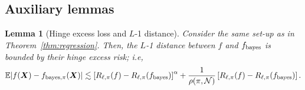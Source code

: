\documentclass[11pt]{article}
\theoremstyle{plain}
\newtheorem{lem}{Lemma}
\theoremstyle{definition}
\def\bayesf{f_{\textup{bayes}}}
\def\bayespif{f_{\textup{bayes},\pi}}
\begin{document}
\clearpage
\subsection{Auxiliary lemmas}


\begin{lem}[Hinge excess loss and $L$-1 distance]\label{lem:hingeL1} Consider the same set-up as in Theorem~\ref{thm:regression}. Then, the $L$-1 distance between $f$ and $\bayesf$ is bounded by their hinge excess risk; i.e,
\begin{equation}
\mathbb{E}|f(\mX)-\bayespif(\mX)|
\lesssim
\left[R_{\ell,\pi}(f)-R_{\ell,\pi}(\bayesf)\right]^{\alpha}+
 {1\over \rho(\pi, \tN)}\left[R_{\ell,\pi}(f)-R_{\ell,\pi}(\bayesf)\right].
\end{equation}
\end{lem}
\end{document}
